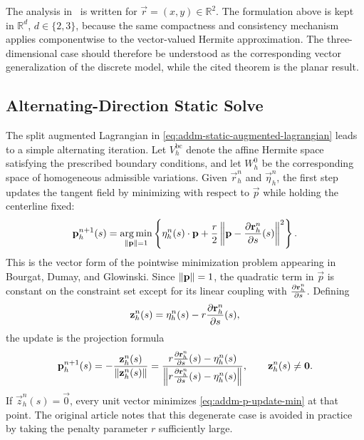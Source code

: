 The analysis in~\autocite{glowinski_large_nodate} is written for \(\vec
r=(x,y)\in\mathbb{R}^2\). The formulation above is kept in \(\mathbb{R}^d\),
\(d\in\{2,3\}\), because the same compactness and consistency mechanism applies
componentwise to the vector-valued Hermite approximation. The three-dimensional
case should therefore be understood as the corresponding vector generalization
of the discrete model, while the cited theorem is the planar result.

\subsection{Alternating-Direction Static Solve}

The split augmented Lagrangian in \eqref{eq:addm-static-augmented-lagrangian}
leads to a simple alternating iteration. Let \(V_h^{\mathrm{bc}}\) denote the
affine Hermite space satisfying the prescribed boundary conditions, and let
\(W_h^0\) be the corresponding space of homogeneous admissible variations.
Given \(\vec r_h^n\) and \(\vec \eta_h^n\), the first step updates the tangent
field by minimizing with respect to \(\vec p\) while holding the centerline
fixed:
\begin{equation}\label{eq:addm-p-update-min}
    \mathbf{p}_h^{n+1}(s)
    =
    \operatorname*{arg\,min}_{\left\lVert \mathbf{p} \right\rVert=1}
    \left\{
    \mathbf{\eta}_h^n(s)\cdot \mathbf{p}
    +
    \frac{r}{2}
    \left\lVert 
        \mathbf{p}
        -
        \pdv{\mathbf{r}_h^n}{s}(s)
     \right\rVert^2
    \right\}.
\end{equation}
This is the vector form of the pointwise minimization problem appearing in
Bourgat, Dumay, and Glowinski. Since \(\left\lVert \mathbf{p} \right\rVert=1\), the quadratic term in
\(\vec p\) is constant on the constraint set except for its linear coupling with
\(\pdv{\mathbf{r}_h^n}{s}\). Defining
\begin{equation}\label{eq:addm-projection-vector}
    \mathbf{z}_h^n(s)
    =
    \mathbf{\eta}_h^n(s)
    -
    r\pdv{\mathbf{r}_h^n}{s}(s),
\end{equation}
the update is the projection formula
\begin{equation}\label{eq:addm-p-update-projection}
    \mathbf{p}_h^{n+1}(s)
    =
    -
    \frac{\mathbf{z}_h^n(s)}{\left\lVert \mathbf{z}_h^n(s) \right\rVert}
    =
    \frac{
        r\pdv{\mathbf{r}_h^n}{s}(s)-\mathbf{\eta}_h^n(s)
    }{
        \left\lVert 
            r\pdv{\mathbf{r}_h^n}{s}(s)-\mathbf{\eta}_h^n(s)
         \right\rVert
    },
    \qquad
    \mathbf{z}_h^n(s)\neq \mathbf{0}.
\end{equation}
If \(\vec z_h^n(s)=\vec 0\), every unit vector minimizes
\eqref{eq:addm-p-update-min} at that point. The original article notes that this
degenerate case is avoided in practice by taking the penalty parameter \(r\)
sufficiently large.

